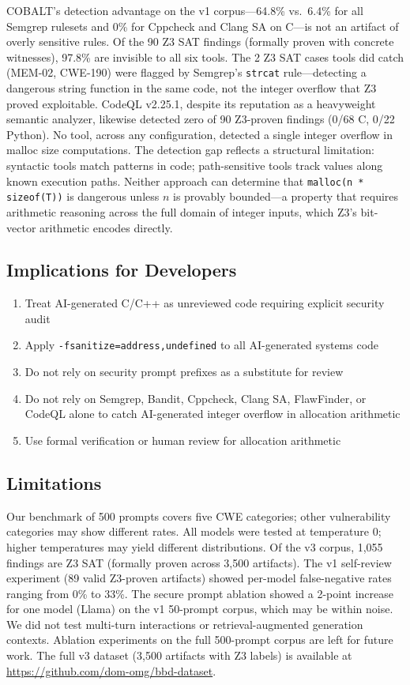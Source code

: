 \documentclass[10pt,twocolumn]{article}
\begin{document}
COBALT's detection advantage on the v1 corpus---64.8\% vs.\ 6.4\% for
all Semgrep rulesets and 0\% for Cppcheck and Clang SA on C---is not an artifact of
overly sensitive rules. Of the 90 Z3 SAT findings (formally proven with
concrete witnesses), 97.8\% are invisible to all six tools. The 2 Z3
SAT cases tools did catch (MEM-02, CWE-190) were flagged by Semgrep's
\texttt{strcat} rule---detecting a dangerous string function in the same
code, not the integer overflow that Z3 proved exploitable. CodeQL
v2.25.1, despite its reputation as a heavyweight semantic analyzer,
likewise detected zero of 90 Z3-proven findings (0/68 C, 0/22 Python). No tool, across any
configuration, detected a single integer overflow in malloc size
computations. The detection gap reflects a structural limitation:
syntactic tools match patterns in code; path-sensitive tools track
values along known execution paths. Neither approach can determine that
\texttt{malloc(n * sizeof(T))} is dangerous unless $n$ is provably
bounded---a property that requires arithmetic reasoning across the full
domain of integer inputs, which Z3's bit-vector arithmetic encodes
directly.

\subsection{Implications for Developers}

\begin{enumerate}
  \item Treat AI-generated C/C++ as unreviewed code requiring explicit
    security audit
  \item Apply \texttt{-fsanitize=address,undefined} to all AI-generated
    systems code
  \item Do not rely on security prompt prefixes as a substitute for
    review
  \item Do not rely on Semgrep, Bandit, Cppcheck, Clang SA, FlawFinder,
    or CodeQL alone to catch AI-generated integer overflow in allocation
    arithmetic
  \item Use formal verification or human review for allocation arithmetic
\end{enumerate}

\subsection{Limitations}

Our benchmark of 500 prompts covers five CWE categories; other
vulnerability categories may show different rates. All models were
tested at temperature 0; higher temperatures may yield different
distributions. Of the v3 corpus, 1,055 findings are Z3 SAT (formally
proven across 3,500 artifacts). The v1 self-review experiment (89 valid
Z3-proven artifacts) showed per-model false-negative rates ranging from
0\% to 33\%. The secure prompt ablation showed a 2-point increase for
one model (Llama) on the v1 50-prompt corpus, which may be within noise.
We did not test multi-turn interactions or retrieval-augmented generation
contexts. Ablation experiments on the full 500-prompt corpus are left for
future work. The full v3 dataset (3,500 artifacts with Z3 labels) is
available at \url{https://github.com/dom-omg/bbd-dataset}.
\end{document}
